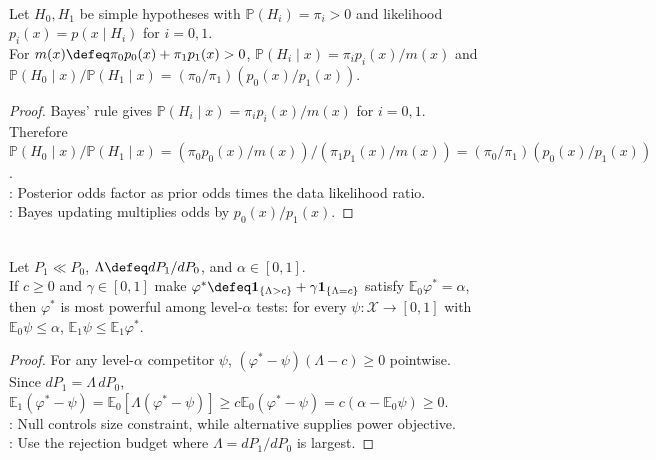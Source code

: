 \begin{proposition} \label{prop:posterior-odds-likelihood-ratio} \\
Let $H_0,H_1$ be simple hypotheses with $\mathbb{P}(H_i)=\pi_i>0$ and likelihood $p_i(x)=p(x\mid H_i)$ for $i=0,1$.\\
For $m(x)\defeq\pi_0p_0(x)+\pi_1p_1(x)>0$, $\mathbb{P}(H_i\mid x)=\pi_ip_i(x)/m(x)$ and $\mathbb{P}(H_0\mid x)/\mathbb{P}(H_1\mid x)=(\pi_0/\pi_1)(p_0(x)/p_1(x))$.
\begin{proof}
Bayes' rule gives $\mathbb{P}(H_i\mid x)=\pi_ip_i(x)/m(x)$ for $i=0,1$.\\
Therefore $\mathbb{P}(H_0\mid x)/\mathbb{P}(H_1\mid x)=(\pi_0p_0(x)/m(x))/(\pi_1p_1(x)/m(x))=(\pi_0/\pi_1)(p_0(x)/p_1(x))$.\\
: Posterior odds factor as prior odds times the data likelihood ratio.\\
: Bayes updating multiplies odds by $p_0(x)/p_1(x)$.
\end{proof}
\end{proposition}

\begin{theorem} \label{thm:neyman-pearson-lemma} \\
Let $P_1\ll P_0$, $\Lambda\defeq dP_1/dP_0$, and $\alpha\in[0,1]$.\\
If $c\geq0$ and $\gamma\in[0,1]$ make $\varphi^\ast\defeq\mathbf{1}_{\{\Lambda>c\}}+\gamma\mathbf{1}_{\{\Lambda=c\}}$ satisfy $\mathbb{E}_0\varphi^\ast=\alpha$,\\
then $\varphi^\ast$ is most powerful among level-$\alpha$ tests: for every $\psi:\mathcal{X}\to[0,1]$ with $\mathbb{E}_0\psi\leq\alpha$, $\mathbb{E}_1\psi\leq\mathbb{E}_1\varphi^\ast$.
\begin{proof}
For any level-$\alpha$ competitor $\psi$, $(\varphi^\ast-\psi)(\Lambda-c)\geq0$ pointwise.\\
Since $dP_1=\Lambda\,dP_0$, $\mathbb{E}_1(\varphi^\ast-\psi)=\mathbb{E}_0[\Lambda(\varphi^\ast-\psi)]\geq c\mathbb{E}_0(\varphi^\ast-\psi)=c(\alpha-\mathbb{E}_0\psi)\geq0$.\\
: Null controls size constraint, while alternative supplies power objective.\\
: Use the rejection budget where $\Lambda=dP_1/dP_0$ is largest.
\end{proof}
\end{theorem}

